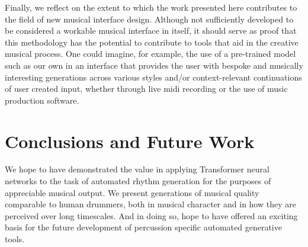 \documentclass[sigconf]{nimeart}
\begin{document}
Finally, we reflect on the extent to which the work presented here contributes to the field of new musical interface design. Although not sufficiently developed to be considered a workable musical interface in itself, it should serve as proof that this methodology has the potential to contribute to tools that aid in the creative musical process. One could imagine, for example, the use of a pre-trained model such as our own in an interface that provides the user with bespoke and musically interesting generations across various styles and/or context-relevant continuations of user created input, whether through live midi recording or the use of music production software.

\section{Conclusions and Future Work}\label{conclusions-and-future-work}

We hope to have demonstrated the value in applying Transformer neural networks to the task of automated rhythm generation for the purposes of appreciable musical output. We present generations of musical quality comparable to human drummers, both in musical character and in how they are perceived over long timescales. And in doing so, hope to have offered an exciting basis for the future development of percussion specific automated generative tools.
\end{document}
